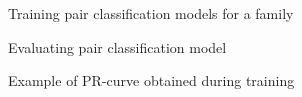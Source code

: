 \documentclass{article}
\begin{document}
			\begin{figure}
				\caption{Training pair classification models for a family}
				\label{fig:train_classify1}
			\end{figure}
			
			\begin{figure}
				\caption{Evaluating pair classification model}
				\label{fig:train_classify2}
			\end{figure}
			
			\begin{figure}[h!]
				\caption{Example of PR-curve obtained during training}
				\label{fig:test_PR-curve}
			\end{figure}
		
\end{document}
